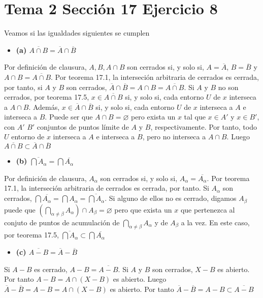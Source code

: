 \documentclass{article}
\begin{document}
\section{Tema 2 Sección 17 Ejercicio 8}
Veamos si las igualdades siguientes se cumplen
\begin{itemize}
\item \bf (a) \rm  $\overline{A \cap B}= \overline{A}\cap \overline{B}$
\end{itemize}
Por definición de clausura, $A, B,A\cap B$ son cerrados si, y solo si, $A=\overline{A}$, $B=\overline{B}$ y $A\cap B=\overline{A\cap B}$. Por teorema 17.1, la interseción arbitraria de cerrados es cerrada, por tanto, si $A$ y $B$ son cerrados, $\overline{A}\cap\overline{B}=A\cap B=\overline{A\cap B}$. Si $A$ y $B$ no son cerrados, por teorema 17.5, $x\in \overline{A\cap B}$ si, y solo si, cada entorno $U$ de $x$ interseca a $A\cap B$. Además, $x\in \overline{A}\cap \overline{B}$ si, y solo si, cada entorno $U$ de $x$ interseca a $A$ e interseca a $B$. Puede ser que $A\cap B=\varnothing$ pero exista un $x$ tal que $x\in A'$ y $x\in B'$, con $A'$ $B'$ conjuntos de puntos límite de $A$ y $B$, respectivamente. Por tanto, todo $U$ entorno de $x$ interseca a $A$ e interseca a $B$, pero no interseca a $A\cap B$. Luego $\overline{A\cap B}\subset \overline{A}\cap \overline{B}$
\begin{itemize}
\item \bf (b) \rm  $\overline{\bigcap A_\alpha}= \bigcap \overline{A_\alpha}$
\end{itemize}
Por definición de clausura, $A_\alpha$ son cerrados si, y solo si, $A_\alpha=\overline{A_\alpha}$. Por teorema 17.1, la interseción arbitraria de cerrados es cerrada, por tanto. Si $A_\alpha$ son cerrados, $\bigcap\overline{A_\alpha}=\bigcap A_\alpha=\overline{\bigcap A_\alpha}$. Si alguno de ellos no es cerrado, digamos $A_\beta$ puede que $\left(\bigcap_{\alpha\neq\beta}A_\alpha\right)\cap A_\beta=\varnothing$ pero que exista un $x$ que pertenezca al conjuto de puntos de acumulación de $\bigcap_{\alpha\neq\beta}A_\alpha$ y de $A_\beta$ a la vez. En este caso, por teorema 17.5, $\overline{\bigcap A_\alpha}\subset \bigcap \overline{A_\alpha}$
\begin{itemize}
\item \bf (c) \rm  $\overline{ A-B}= \overline{A} -\overline{B}$
\end{itemize}
Si $A-B$ es cerrado, $A-B=\overline{A-B}$. Si $A$ y $B$ son cerrados, $X-B$ es abierto. Por tanto $A-B=A\cap (X-B)$ es abierto. Luego $\overline{A} -\overline{B}=A-B=A\cap (X-B)$ es abierto. Por tanto $\overline{A} -\overline{B}=A-B\subset \overline{A-B}$
\end{document}
